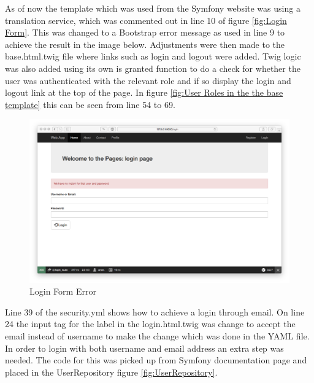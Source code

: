 As of now the template which was used from the Symfony website was using a translation service, which was commented out in line 10 of figure \ref{fig:Login Form}. This was changed to a Bootstrap error message as used in line 9 to achieve the result in the image below. Adjustments were then made to the base.html.twig file where links such as login and logout were added. Twig logic was also added using its own is granted function to do a check for whether the user was authenticated with the relevant role and if so display the login and logout link at the top of the page. In figure \ref{fig:User Roles in the the base template} this can be seen from line 54 to 69.

\begin{figure}[htbp]
   \centering
   \includegraphics[width=400pt]{figures/login_error.png} %
   \caption{Login Form Error}
   \label{fig:Login Form Error}
\end{figure}

Line 39 of the security.yml shows how to achieve a login through email. On line 24 the input tag for the label in the login.html.twig was change to accept the email instead of username to make the change which was done in the YAML file. In order to login with both username and email address an extra step was needed. The code for this was picked up from Symfony documentation page and placed in the UserRepository figure \ref{fig:UserRepository}.

